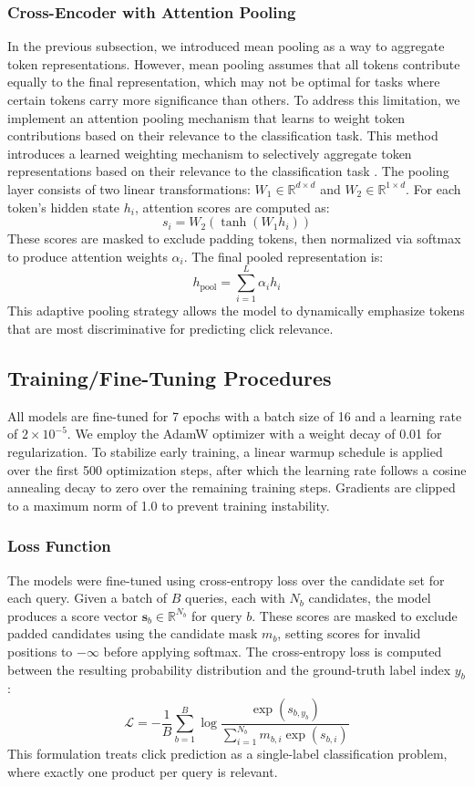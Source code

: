 \documentclass[10pt]{article}
\begin{document}
\subsubsection*{Cross-Encoder with Attention Pooling}
In the previous subsection, we introduced mean pooling as a way to aggregate token representations. However, mean pooling assumes that all tokens contribute equally to the final representation, which may not be optimal for tasks where certain tokens carry more significance than others. To address this limitation, we implement an attention pooling mechanism that learns to weight token contributions based on their relevance to the classification task.
This method introduces a learned weighting mechanism to selectively aggregate token representations based on their relevance to the classification task \cite{santos2016attentivepoolingnetworks}. The pooling layer consists of two linear transformations: $W_1 \in \mathbb{R}^{d \times d}$ and $W_2 \in \mathbb{R}^{1 \times d}$. For each token's hidden state $h_i$, attention scores are computed as:
\[
s_i = W_2 \left( \tanh(W_1 h_i) \right)
\]
These scores are masked to exclude padding tokens, then normalized via softmax to produce attention weights $\alpha_i$. The final pooled representation is:
\[
h_{\text{pool}} = \sum_{i=1}^{L} \alpha_i h_i
\]
This adaptive pooling strategy allows the model to dynamically emphasize tokens that are most discriminative for predicting click relevance.
\subsection*{Training/Fine-Tuning Procedures}
All models are fine-tuned for 7 epochs with a batch size of 16 and a learning rate of $2 \times 10^{-5}$. We employ the AdamW optimizer \cite{loshchilov2019decoupledweightdecayregularization} with a weight decay of 0.01 for regularization. To stabilize early training, a linear warmup schedule is applied over the first 500 optimization steps, after which the learning rate follows a cosine annealing decay \cite{loshchilov2017sgdrstochasticgradientdescent} to zero over the remaining training steps. Gradients are clipped to a maximum norm of 1.0 to prevent training instability.

\subsubsection*{Loss Function}
The models were fine-tuned using cross-entropy loss over the candidate set for each query. Given a batch of $B$ queries, each with $N_b$ candidates, the model produces a score vector $\mathbf{s}_b \in \mathbb{R}^{N_b}$ for query $b$. These scores are masked to exclude padded candidates using the candidate mask $m_b$, setting scores for invalid positions to $-\infty$ before applying softmax. The cross-entropy loss is computed between the resulting probability distribution and the ground-truth label index $y_b$:
\[
\mathcal{L} = -\frac{1}{B} \sum_{b=1}^{B} \log \frac{\exp(s_{b, y_b})}{\sum_{i=1}^{N_b} m_{b,i} \exp(s_{b,i})}
\]
This formulation treats click prediction as a single-label classification problem, where exactly one product per query is relevant.
\end{document}
